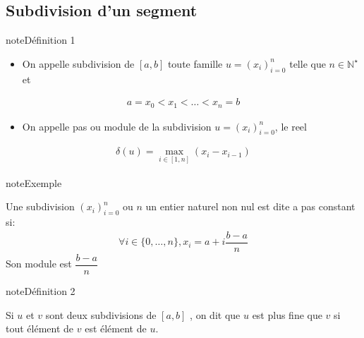 \documentclass[letterpaper,10pt,french]{sphinxmanual}
\begin{document}
\subsection{Subdivision d’un segment}
\label{\detokenize{fe:subdivision-d-un-segment}}
\begin{sphinxadmonition}{note}{Définition 1}
\begin{itemize}
\item {} 
\sphinxAtStartPar
On appelle subdivision de \([a, b]\) toute famille \(u=(x_i)_{i=0}^n\) telle que \(n \in \mathbb{N}^\star\) et

\end{itemize}
\begin{equation*}
\begin{split}
a=x_0 < x_1 < \ldots < x_n=b
\end{split}
\end{equation*}\begin{itemize}
\item {} 
\sphinxAtStartPar
On appelle pas ou module de la subdivision \(u=(x_i)_{i=0}^n\), le reel

\end{itemize}
\begin{equation*}
\begin{split}
\delta(u)=\max_{i \in [1, n]}(x_i - x_{i-1})
\end{split}
\end{equation*}\end{sphinxadmonition}

\begin{sphinxadmonition}{note}{Exemple}

\sphinxAtStartPar
Une subdivision \((x_i)_{i=0}^n\) ou \(n\) un entier naturel non nul est dite a pas constant si:
\begin{equation*}
\begin{split}
\forall i \in \{0, \ldots, n\}, x_i = a+i\dfrac{b-a}{n}
\end{split}
\end{equation*}
\sphinxAtStartPar
Son module est \(\dfrac{b-a}{n}\)
\end{sphinxadmonition}

\begin{sphinxadmonition}{note}{Définition 2}

\sphinxAtStartPar
Si \(u\) et \(v\) sont deux subdivisions de \([a, b]\) , on dit que \(u\) est plus fine que \(v\) si tout élément de \(v\) est élément de \(u\).
\end{sphinxadmonition}
\end{document}
